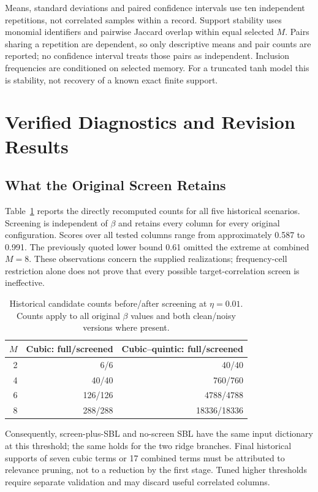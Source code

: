 \documentclass[conference]{IEEEtran}
\begin{document}
Means, standard deviations and paired confidence intervals use ten independent repetitions, not correlated samples within a record. Support stability uses monomial identifiers and pairwise Jaccard overlap within equal selected $M$. Pairs sharing a repetition are dependent, so only descriptive means and pair counts are reported; no confidence interval treats those pairs as independent. Inclusion frequencies are conditioned on selected memory. For a truncated tanh model this is stability, not recovery of a known exact finite support.

\section{Verified Diagnostics and Revision Results}\label{sec:results}
\subsection{What the Original Screen Retains}
Table~\ref{tab:screen-counts} reports the directly recomputed counts for all five historical scenarios. Screening is independent of $\beta$ and retains every column for every original configuration. Scores over all tested columns range from approximately 0.587 to 0.991. The previously quoted lower bound 0.61 omitted the extreme at combined $M=8$. These observations concern the supplied realizations; frequency-cell restriction alone does not prove that every possible target-correlation screen is ineffective.
\begin{table}[!t]
\caption{Historical candidate counts before/after screening at $\eta=0.01$. Counts apply to all original $\beta$ values and both clean/noisy versions where present.}\label{tab:screen-counts}
\centering\small
\begin{tabular}{rrr}\toprule
$M$ & Cubic: full/screened & Cubic--quintic: full/screened\\\midrule
2 & 6/6 & 40/40\\4 & 40/40 & 760/760\\
6 & 126/126 & 4788/4788\\8 & 288/288 & 18336/18336\\\bottomrule
\end{tabular}
\end{table}
Consequently, screen-plus-SBL and no-screen SBL have the same input dictionary at this threshold; the same holds for the two ridge branches. Final historical supports of seven cubic terms or 17 combined terms must be attributed to relevance pruning, not to a reduction by the first stage. Tuned higher thresholds require separate validation and may discard useful correlated columns.
\end{document}

